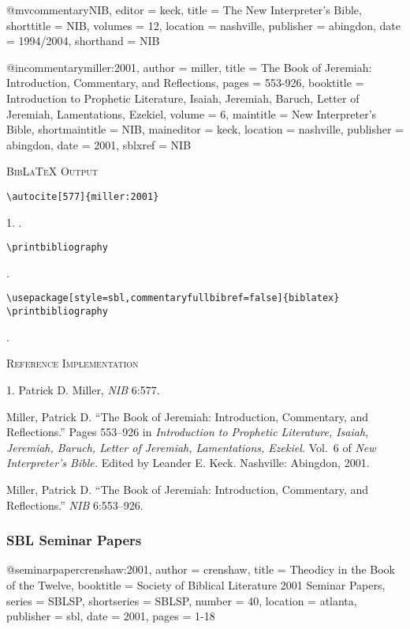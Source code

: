 \documentclass[a4paper]{article}
\newcommand\citetestns[3]{%
  {\textsc{BibLaTeX Output}\par
   \nobreak
   \texttt{\textbackslash autocite[#2]\{#3\}}\par
   \color{biblatex-colour}
   #1. \cite[#2]{#3}.\par
   \color{black}
   \texttt{\textbackslash printbibliography}\par
   \color{biblatex-colour}
   \hangindent\bibindent\bibentrycite{#3}.\par}}
\newenvironment{refimp}{%
  \begin{minipage}{\linewidth}
    \setlength{\parskip}{1ex}
    \textsc{Reference Implementation}\par
    \nobreak
    \color{reference-colour}
}{\end{minipage}}
\newenvironment{vb}{%
  \setlength{\parskip}{0pt}
  \verbatim}{\endverbatim}
\begin{document}
\begin{vb}
@mvcommentary{NIB,
  editor = keck,
  title = {The New Interpreter's Bible},
  shorttitle = {NIB},
  volumes = {12},
  location = nashville,
  publisher = abingdon,
  date = {1994/2004},
  shorthand = {NIB}
}

@incommentary{miller:2001,
  author = miller,
  title = {The Book of Jeremiah: Introduction, Commentary,
           and Reflections},
  pages = {553-926},
  booktitle = {Introduction to Prophetic Literature, Isaiah,
               Jeremiah, Baruch, Letter of Jeremiah,
               Lamentations, Ezekiel},
  volume = {6},
  maintitle = {New Interpreter's Bible},
  shortmaintitle = {NIB},
  maineditor = keck,
  location = nashville,
  publisher = abingdon,
  date = {2001},
  sblxref = {NIB}
}
\end{vb}

\citetestns{1}{577}{miller:2001}

\texttt{\textbackslash usepackage[style=sbl,commentaryfullbibref=false]\{biblatex\} \\
  \textbackslash printbibliography}

{\color{biblatex-colour}
 \togglefalse{commentaryfullbibref}
 \hangindent\bibindent{}.\par}

\begin{refimp}
  1. Patrick D. Miller, \emph{NIB} 6:577.

  \hangindent\bibindent Miller, Patrick D. “The Book of Jeremiah:
  Introduction, Commentary, and Reflections.” Pages 553–926 in
  \emph{Introduction to Prophetic Literature, Isaiah, Jeremiah, Baruch, Letter
  of Jeremiah, Lamentations, Ezekiel.} Vol.~6 of \emph{New Interpreter’s
  Bible.} Edited by Leander E. Keck. Nashville: Abingdon, 2001.

  \hangindent\bibindent Miller, Patrick D. “The Book of Jeremiah:
  Introduction, Commentary, and Reflections.” \emph{NIB} 6:553–926.
\end{refimp}

\subsubsection{SBL Seminar Papers}

\begin{vb}
@seminarpaper{crenshaw:2001,
  author = crenshaw,
  title = {Theodicy in the Book of the Twelve},
  booktitle = {Society of Biblical Literature 2001 Seminar Papers},
  series = SBLSP,
  shortseries = {SBLSP},
  number = {40},
  location = atlanta,
  publisher = sbl,
  date = {2001},
  pages = {1-18}
}
\end{vb}
\end{document}
